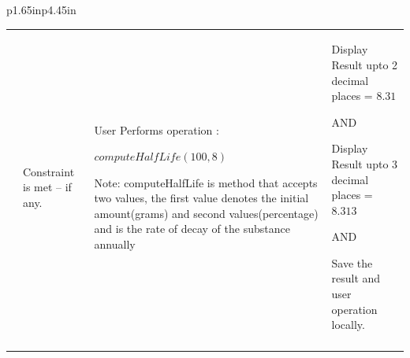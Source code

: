 \documentclass[12pt]{article}
\begin{document}
\begin{table}[H]
\begin{tabular}{p{1.65in}p{4.45in}}
{\begin{table}[H]
\begin{tabular}{p{1.36in}p{1.36in}p{1.36in}p{1.36in}}
\hhline{----}
\multicolumn{1}{|p{1.36in}}{T\_L-US12\_2} & 
\multicolumn{1}{|p{1.36in}}{Constraint is met – if any.} & 
\multicolumn{1}{|p{1.36in}}{User Performs operation :  \par$computeHalfLife(100,8)$\par
Note: computeHalfLife is method that accepts two values, the first value denotes the initial amount(grams) and second values(percentage) and is the rate of decay of the substance annually} & 
\multicolumn{1}{|p{1.36in}|}{Display Result upto 2 decimal places = $8.31$  \par AND \par Display Result upto 3 decimal places = $8.313$  \par AND \par Save the result and user operation locally.} \\
\hhline{----}

\end{tabular}
 \end{table}

\par } \\
\hhline{--}
 \\
\hhline{--}
 \\
\hhline{--}

\end{tabular}
 \end{table}
\end{document}
